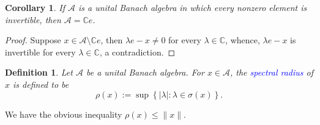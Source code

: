 \documentclass[11pt]{article}
\theoremstyle{thmstyle}
\theoremstyle{defstyle}
\newtheorem{definition}[theorem]{Definition}
\newtheorem*{corollary}{Corollary}
\newcommand{\bbC}{\mathbb{C}}
\newcommand{\calA}{\mathcal{A}} %
\newcommand{\define}[1]{\textcolor{blue}{\textit{#1}}}
\renewcommand{\le}{\leqslant}
\begin{document}
\begin{corollary}
    If $\calA$ is a unital Banach algebra in which every nonzero element is invertible, then $\calA = \bbC e$.
\end{corollary}
\begin{proof}
    Suppose $x\in\calA\setminus\bbC e$, then $\lambda e - x\ne 0$ for every $\lambda\in\bbC$, whence, $\lambda e - x$ is invertible for every $\lambda\in\bbC$, a contradiction.
\end{proof}

\begin{definition}
    Let $\calA$ be a unital Banach algebra. For $x\in\calA$, the \define{spectral radius} of $x$ is defined to be 
    \begin{equation*}
        \rho(x) := \sup\left\{|\lambda|\colon\lambda\in\sigma(x)\right\}.
    \end{equation*}
\end{definition}
We have the obvious inequality $\rho(x)\le\|x\|$.
\end{document}

